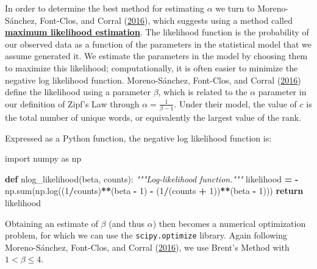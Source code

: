 \documentclass[
]{krantz}
\makeatletter
\newenvironment{Shaded}{\begin{snugshade}}{\end{snugshade}}
\newcommand{\BuiltInTok}[1]{#1}
\newcommand{\CommentTok}[1]{\textcolor[rgb]{0.56,0.35,0.01}{\textit{#1}}}
\newcommand{\ControlFlowTok}[1]{\textcolor[rgb]{0.13,0.29,0.53}{\textbf{#1}}}
\newcommand{\DecValTok}[1]{\textcolor[rgb]{0.00,0.00,0.81}{#1}}
\newcommand{\ImportTok}[1]{#1}
\newcommand{\KeywordTok}[1]{\textcolor[rgb]{0.13,0.29,0.53}{\textbf{#1}}}
\newcommand{\NormalTok}[1]{#1}
\newcommand{\OperatorTok}[1]{\textcolor[rgb]{0.81,0.36,0.00}{\textbf{#1}}}
\newenvironment{kframe}{%
\medskip{}
\setlength{\fboxsep}{.8em}
 \def\at@end@of@kframe{}%
 \ifinner\ifhmode%
  \def\at@end@of@kframe{\end{minipage}}%
  \begin{minipage}{\columnwidth}%
 \fi\fi%
 \def\FrameCommand##1{\hskip\@totalleftmargin \hskip-\fboxsep
 \colorbox{shadecolor}{##1}\hskip-\fboxsep
     \hskip-\linewidth \hskip-\@totalleftmargin \hskip\columnwidth}%
 \MakeFramed {\advance\hsize-\width
   \@totalleftmargin\z@ \linewidth\hsize
   \@setminipage}}%
 {\par\unskip\endMakeFramed%
 \at@end@of@kframe}
\renewenvironment{Shaded}{\begin{kframe}}{\end{kframe}}
\newcommand{\gref}[2]{\hyperlink{#2}{\textbf{#1}}}
\makeatother
\begin{document}
In order to determine the best method for estimating \(\alpha\) we turn to Moreno-Sánchez, Font-Clos, and Corral (\protect\hyperlink{ref-Moreno2016}{2016}),
which suggests using a method called \gref{maximum likelihood estimation}{maximum\_likelihood\_estimation}.
The likelihood function is the probability of our observed data
as a function of the parameters in the statistical model that we assume generated it.
We estimate the parameters in the model by choosing them to maximize this likelihood;
computationally,
it is often easier to minimize the negative log likelihood function.
Moreno-Sánchez, Font-Clos, and Corral (\protect\hyperlink{ref-Moreno2016}{2016}) define the likelihood using a parameter \(\beta\),
which is related to the \(\alpha\) parameter in our definition of Zipf's Law
through \(\alpha = \tfrac{1}{\beta-1}\).
Under their model,
the value of \(c\) is the total number of unique words,
or equivalently the largest value of the rank.

Expressed as a Python function,
the negative log likelihood function is:

\begin{Shaded}
\begin{Highlighting}[]
\ImportTok{import}\NormalTok{ numpy }\ImportTok{as}\NormalTok{ np}

\KeywordTok{def}\NormalTok{ nlog\_likelihood(beta, counts):}
    \CommentTok{"""Log{-}likelihood function."""}
\NormalTok{    likelihood }\OperatorTok{=} \OperatorTok{{-}}\NormalTok{ np.}\BuiltInTok{sum}\NormalTok{(np.log((}\DecValTok{1}\OperatorTok{/}\NormalTok{counts)}\OperatorTok{**}\NormalTok{(beta }\OperatorTok{{-}} \DecValTok{1}\NormalTok{) }\OperatorTok{{-}}\NormalTok{ (}\DecValTok{1}\OperatorTok{/}\NormalTok{(counts }\OperatorTok{+} \DecValTok{1}\NormalTok{))}\OperatorTok{**}\NormalTok{(beta }\OperatorTok{{-}} \DecValTok{1}\NormalTok{)))}
    \ControlFlowTok{return}\NormalTok{ likelihood}
\end{Highlighting}
\end{Shaded}

Obtaining an estimate of \(\beta\) (and thus \(\alpha\))
then becomes a numerical optimization problem,
for which we can use the \texttt{scipy.optimize} library.
Again following Moreno-Sánchez, Font-Clos, and Corral (\protect\hyperlink{ref-Moreno2016}{2016}),
we use Brent's Method with \(1 < \beta \leq 4\).
\end{document}
